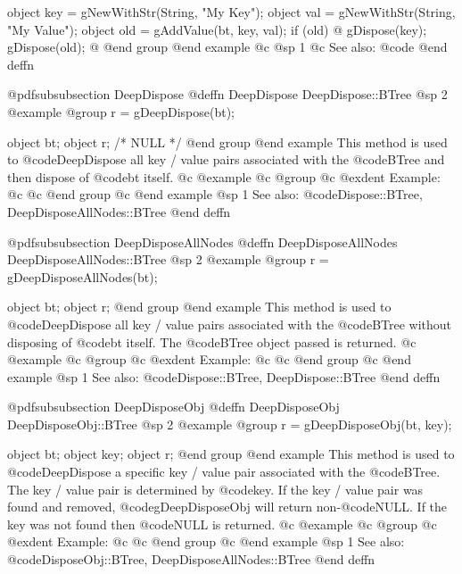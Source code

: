 object  key = gNewWithStr(String, "My Key");
object  val = gNewWithStr(String, "My Value");
object  old = gAddValue(bt, key, val);
if (old) @{
        gDispose(key);
        gDispose(old);
@}
@end group
@end example
@c @sp 1
@c See also:  @code{}
@end deffn














@pdfsubsubsection {DeepDispose}
@deffn {DeepDispose} DeepDispose::BTree
@sp 2
@example
@group
r = gDeepDispose(bt);

object  bt;
object  r;     /*  NULL  */
@end group
@end example
This method is used to @code{DeepDispose} all key / value pairs
associated with the @code{BTree} and then dispose of @code{bt} itself.
@c @example
@c @group
@c @exdent Example:
@c 
@c @end group
@c @end example
@sp 1
See also:  @code{Dispose::BTree, DeepDisposeAllNodes::BTree}
@end deffn












@pdfsubsubsection {DeepDisposeAllNodes}
@deffn {DeepDisposeAllNodes} DeepDisposeAllNodes::BTree
@sp 2
@example
@group
r = gDeepDisposeAllNodes(bt);

object  bt;
object  r;
@end group
@end example
This method is used to @code{DeepDispose} all key / value pairs
associated with the @code{BTree} without disposing of @code{bt} itself.
The @code{BTree} object passed is returned.
@c @example
@c @group
@c @exdent Example:
@c 
@c @end group
@c @end example
@sp 1
See also:  @code{Dispose::BTree, DeepDispose::BTree}
@end deffn











@pdfsubsubsection {DeepDisposeObj}
@deffn {DeepDisposeObj} DeepDisposeObj::BTree
@sp 2
@example
@group
r = gDeepDisposeObj(bt, key);

object  bt;
object  key;
object  r;
@end group
@end example
This method is used to @code{DeepDispose} a specific key / value pair
associated with the @code{BTree}.  The key / value pair is determined by
@code{key}.  If the key / value pair was found and removed,
@code{gDeepDisposeObj} will return non-@code{NULL}.  If the key was not
found then @code{NULL} is returned.
@c @example
@c @group
@c @exdent Example:
@c 
@c @end group
@c @end example
@sp 1
See also:  @code{DisposeObj::BTree, DeepDisposeAllNodes::BTree}
@end deffn

















